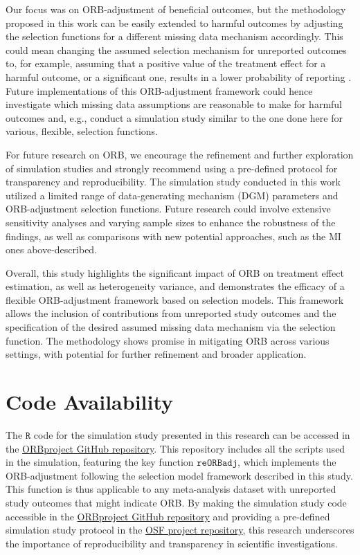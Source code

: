 \documentclass[twocolumn]{article}\usepackage[]{graphicx}\usepackage[]{xcolor}
\begin{document}
Our focus was on ORB-adjustment of beneficial outcomes, but the methodology proposed in this work can be easily extended to harmful outcomes by adjusting the selection functions for a different missing data mechanism accordingly. This could mean changing the assumed selection mechanism for unreported outcomes to, for example, assuming that a positive value of the treatment effect for a harmful outcome, or a significant one, results in a lower probability of reporting \citep{Copas2019, Copas2014, ORBIT_paper}. Future implementations of this ORB-adjustment framework could hence investigate which missing data assumptions are reasonable to make for harmful outcomes and, e.g., conduct a simulation study similar to the one done here for various, flexible, selection functions.

For future research on ORB, we encourage the refinement and further exploration of simulation studies and strongly recommend using a pre-defined protocol for transparency and reproducibility. The simulation study conducted in this work utilized a limited range of data-generating mechanism (DGM) parameters and ORB-adjustment selection functions. Future research could involve extensive sensitivity analyses and varying sample sizes to enhance the robustness of the findings, as well as comparisons with new potential approaches, such as the MI ones above-described.

Overall, this study highlights the significant impact of ORB on treatment effect estimation, as well as heterogeneity variance, and demonstrates the efficacy of a flexible ORB-adjustment framework based on selection models. This framework allows the inclusion of contributions from unreported study outcomes and the specification of the desired assumed missing data mechanism via the selection function. The methodology shows promise in mitigating ORB across various settings, with potential for further refinement and broader application.

\section{Code Availability}

The $\texttt{R}$ code for the simulation study presented in this research can be accessed in the \href{https://github.com/agaiasaracini/ORBproject}{ORBproject GitHub repository}. This repository includes all the scripts used in the simulation, featuring the key function $\texttt{reORBadj}$, which implements the ORB-adjustment following the selection model framework described in this study. This function is thus applicable to any meta-analysis dataset with unreported study outcomes that might indicate ORB. By making the simulation study code accessible in the \href{https://github.com/agaiasaracini/ORBproject}{ORBproject GitHub repository} and providing a pre-defined simulation study protocol in the \href{https://osf.io/ancdu/}{OSF project repository}, this research underscores the importance of reproducibility and transparency in scientific investigations.
\end{document}
